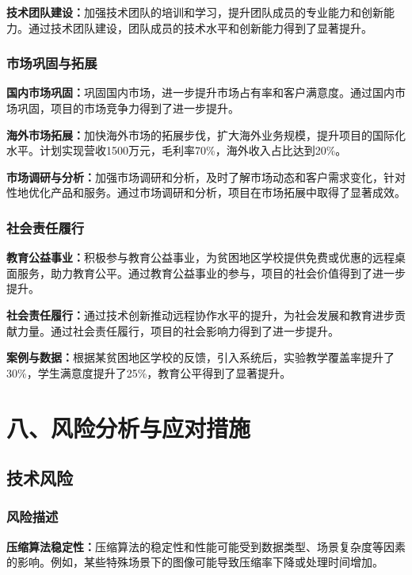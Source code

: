 \documentclass[12pt,a4paper]{article}
\begin{document}
\textbf{技术团队建设：}加强技术团队的培训和学习，提升团队成员的专业能力和创新能力。通过技术团队建设，团队成员的技术水平和创新能力得到了显著提升。

\subsubsection{市场巩固与拓展}
\textbf{国内市场巩固：}巩固国内市场，进一步提升市场占有率和客户满意度。通过国内市场巩固，项目的市场竞争力得到了进一步提升。

\textbf{海外市场拓展：}加快海外市场的拓展步伐，扩大海外业务规模，提升项目的国际化水平。计划实现营收1500万元，毛利率70\%，海外收入占比达到20\%。

\textbf{市场调研与分析：}加强市场调研和分析，及时了解市场动态和客户需求变化，针对性地优化产品和服务。通过市场调研和分析，项目在市场拓展中取得了显著成效。

\subsubsection{社会责任履行}
\textbf{教育公益事业：}积极参与教育公益事业，为贫困地区学校提供免费或优惠的远程桌面服务，助力教育公平。通过教育公益事业的参与，项目的社会价值得到了进一步提升。

\textbf{社会责任履行：}通过技术创新推动远程协作水平的提升，为社会发展和教育进步贡献力量。通过社会责任履行，项目的社会影响力得到了进一步提升。

\textbf{案例与数据：}根据某贫困地区学校的反馈，引入系统后，实验教学覆盖率提升了30\%，学生满意度提升了25\%，教育公平得到了显著提升。

\section{八、风险分析与应对措施}

\subsection{技术风险}

\subsubsection{风险描述}
\textbf{压缩算法稳定性：}压缩算法的稳定性和性能可能受到数据类型、场景复杂度等因素的影响。例如，某些特殊场景下的图像可能导致压缩率下降或处理时间增加。
\end{document}

